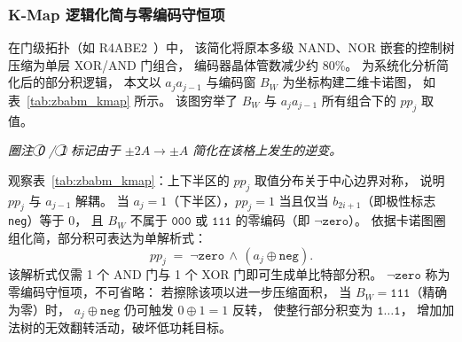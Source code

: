 \documentclass[12pt,a4paper,UTF8]{article}
\begin{document}
\subsubsection{K-Map 逻辑化简与零编码守恒项}

在门级拓扑（如 R4ABE2~\cite{liu2017radix4}）中，
该简化将原本多级 NAND、NOR 嵌套的控制树压缩为单层 XOR/AND 门组合，
编码器晶体管数减少约 80\%。
为系统化分析简化后的部分积逻辑，
本文以 $a_j a_{j-1}$ 与编码窗 $B_W$ 为坐标构建二维卡诺图，
如表~\ref{tab:zbabm_kmap} 所示。
该图穷举了 $B_W$ 与 $a_j a_{j-1}$ 所有组合下的 $pp_j$ 取值。

\begin{table}[htbp]
\centering
\caption{ZBA-BM 部分积 $pp_j$ 的二维卡诺图}
\label{tab:zbabm_kmap}

\smallskip
\footnotesize{\textit{圈注 \textcircled{\scriptsize 0} / \textcircled{\scriptsize 1} 标记由于 $\pm 2A \to \pm A$ 简化在该格上发生的逆变。}}
\end{table}

观察表~\ref{tab:zbabm_kmap}：上下半区的 $pp_j$ 取值分布关于中心边界对称，
说明 $pp_j$ 与 $a_{j-1}$ 解耦。
当 $a_j = 1$（下半区），$pp_j = 1$ 当且仅当 $b_{2i+1}$（即极性标志 \texttt{neg}）等于 0，
且 $B_W$ 不属于 $\mathtt{000}$ 或 $\mathtt{111}$ 的零编码（即 $\neg\mathtt{zero}$）。
依据卡诺图圈组化简，部分积可表达为单解析式：
\begin{equation}
\label{eq:zbabm_pp}
pp_j \;=\; \neg\mathtt{zero} \,\land\, (a_j \oplus \mathtt{neg}) .
\end{equation}
该解析式仅需 1 个 AND 门与 1 个 XOR 门即可生成单比特部分积。
$\neg\mathtt{zero}$ 称为零编码守恒项，不可省略：
若擦除该项以进一步压缩面积，
当 $B_W = \mathtt{111}$（精确为零）时，
$a_j \oplus \mathtt{neg}$ 仍可触发 $0\oplus 1 = 1$ 反转，
使整行部分积变为 $\mathtt{1\dots 1}$，
增加加法树的无效翻转活动，破坏低功耗目标。
\end{document}
